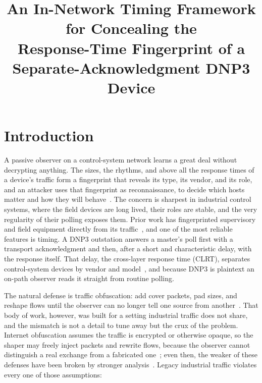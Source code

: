 \documentclass[conference]{IEEEtran}
\title{An In-Network Timing Framework for Concealing the\\Response-Time Fingerprint of a Separate-Acknowledgment DNP3 Device}
\author{\IEEEauthorblockN{Anonymous submission}}
\begin{document}
\maketitle

\section{Introduction}

A passive observer on a control-system network learns a great deal without decrypting anything. The
sizes, the rhythms, and above all the response times of a device's traffic form a fingerprint that
reveals its type, its vendor, and its role, and an attacker uses that fingerprint as reconnaissance, to
decide which hosts matter and how they will behave~\cite{kohno2005remote, radhakrishnan2014gtid,
shu2006fingerprint}. The concern is sharpest in industrial control systems, where the field devices are
long lived, their roles are stable, and the very regularity of their polling exposes them. Prior work
has fingerprinted supervisory and field equipment directly from its
traffic~\cite{jeon2016passive, formby2016control}, and one of the most reliable features is timing. A
DNP3 outstation answers a master's poll first with a transport acknowledgment and then, after a short
and characteristic delay, with the response itself. That delay, the cross-layer response time (CLRT),
separates control-system devices by vendor and model~\cite{formby2016control}, and because DNP3 is
plaintext an on-path observer reads it straight from routine polling.

The natural defense is traffic obfuscation: add cover packets, pad sizes, and reshape flows until the
observer can no longer tell one source from another~\cite{wright2009morphing, cai2014csbuflo,
juarez2016wtfpad, apthorpe2019stp}. That body of work, however, was built for a setting industrial
traffic does not share, and the mismatch is not a detail to tune away but the crux of the problem.
Internet obfuscation assumes the traffic is encrypted or otherwise opaque, so the shaper may freely
inject packets and rewrite flows, because the observer cannot distinguish a real exchange from a
fabricated one~\cite{juarez2016wtfpad, wright2009morphing}; even then, the weaker of these defenses have
been broken by stronger analysis~\cite{dyer2012peekaboo, sirinam2018df}. Legacy industrial traffic
violates every one of those assumptions:
\end{document}
